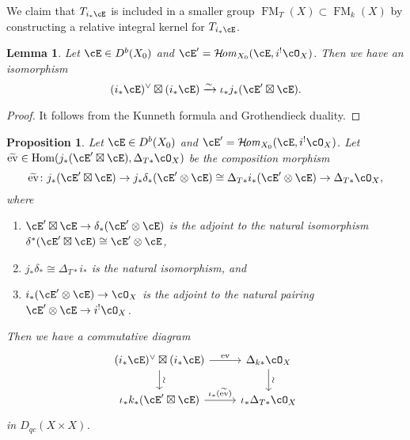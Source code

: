 \documentclass[12pt]{amsart}
\numberwithin{equation}{section}
\theoremstyle{plain}
\newtheorem{lemma}[theorem]{Lemma}
\newtheorem{proposition}[theorem]{Proposition}
\theoremstyle{definition}
\DeclareMathOperator{\Hom}{\mathrm{Hom}}
\DeclareMathOperator{\CHom}{\mathcal{H}\!\mathit{om}}
\DeclareMathOperator{\ev}{\mathrm{ev}}
\DeclareMathOperator{\FM}{\mathrm{FM}}
\begin{document}
We claim that $T_{i_*{\cE}}$ is included in a smaller group $\FM_T(X) \subset \FM_k(X)$ by constructing a relative integral kernel for $T_{i_*{\cE}}$.
\begin{lemma}
    Let $\cE \in D^b(X_0)$ and $\cE' = \CHom_{X_0}(\cE, i^!\cO_X)$.
    Then we have an isomorphism
    \begin{equation}
        (i_*{\cE})^\vee \boxtimes (i_*{\cE}) \xrightarrow{\sim} \iota_*j_*(\cE' \boxtimes \cE).
    \end{equation}
\end{lemma}
\begin{proof}
    It follows from the Kunneth formula and Grothendieck duality.
\end{proof}
\begin{proposition}
    Let $\cE \in D^b(X_0)$ and $\cE' = \CHom_{X_0}(\cE, i^!\cO_X)$.
    Let $\widetilde{\ev} \in \Hom(j_*(\cE' \boxtimes \cE), \Delta_{T*}\cO_X)$ be the composition morphism
    \begin{equation}
        \widetilde{\ev} \colon j_*(\cE' \boxtimes \cE) \to j_*\delta_*(\cE' \otimes \cE)\cong \Delta_{T*}i_*(\cE' \otimes \cE) \to \Delta_{T*}\cO_X,
    \end{equation}
    where
    \begin{enumerate}
        \item $\cE' \boxtimes \cE \to \delta_*(\cE' \otimes \cE)$ is the adjoint to the natural isomorphism $\delta^*(\cE' \boxtimes \cE) \cong \cE' \otimes \cE$,
        \item $j_*\delta_* \cong \Delta_{T*}i_*$ is the natural isomorphism, and
        \item $i_*(\cE' \otimes \cE) \to \cO_X$ is the adjoint to the natural pairing $\cE' \otimes \cE \to i^!\cO_X$.
    \end{enumerate}
    Then we have a commutative diagram
    \begin{equation}
        \begin{tikzcd}\label{eq:commutative-diagram-for-evaluation-map}
            (i_*{\cE})^\vee \boxtimes (i_*{\cE})\ar[r, "\ev"] \ar[d, "\sim", sloped] & \Delta_{k*}\cO_X \ar[d, "\sim", sloped]\\
            \iota_*k_*(\cE' \boxtimes \cE) \ar[r, "\iota_*(\widetilde{\ev})"]& \iota_*\Delta_{T*}\cO_X
        \end{tikzcd}
    \end{equation}
    in $D_{qc}(X \times X)$.
\end{proposition}
\end{document}
